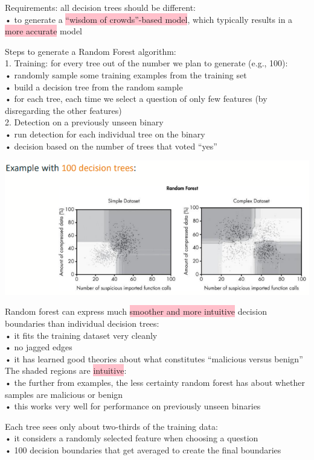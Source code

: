 \documentclass[]{project_plan}
\begin{document}
Requirements: all decision trees should be different:\\
• to generate a \colorbox{pink}{“wisdom of crowds”-based model}, which typically results in a \colorbox{pink}{more accurate} model

Steps to generate a Random Forest algorithm:\\
1. Training: for every tree out of the number we plan to generate (e.g., 100):\\
• randomly sample some training examples from the training set\\
• build a decision tree from the random sample\\
• for each tree, each time we select a question of only few features (by disregarding the
other features)\\
2. Detection on a previously unseen binary\\
• run detection for each individual tree on the binary\\
• decision based on the number of trees that voted “yes”

\includegraphics[width=.9\linewidth]{ml81.png}

Random forest can express much \colorbox{pink}{smoother and more intuitive} decision boundaries than
individual decision trees:\\
• it fits the training dataset very cleanly\\
• no jagged edges\\
• it has learned good theories about what constitutes “malicious versus benign”\\

The shaded regions are \colorbox{pink}{intuitive}:\\
• the further from examples, the less certainty random forest has about whether samples are malicious or
benign\\
• this works very well for performance on previously unseen binaries

Each tree sees only about two-thirds of the training data:\\
• it considers a randomly selected feature when choosing a question\\
• 100 decision boundaries that get averaged to create the final boundaries
\end{document}
